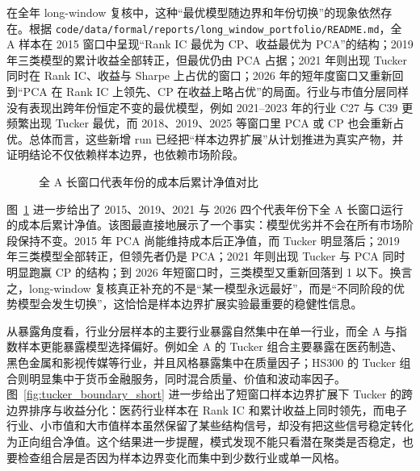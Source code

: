 在全年 long-window 复核中，这种“最优模型随边界和年份切换”的现象依然存在。根据 \texttt{code/data/formal/reports/long\_window\_portfolio/README.md}，全 A 样本在 2015 窗口中呈现“Rank IC 最优为 CP、收益最优为 PCA”的结构；2019 年三类模型的累计收益全部转正，但最优仍由 PCA 占据；2021 年则出现 Tucker 同时在 Rank IC、收益与 Sharpe 上占优的窗口；2026 年的短年度窗口又重新回到“PCA 在 Rank IC 上领先、CP 在收益上略占优”的局面。行业与市值分层同样没有表现出跨年份恒定不变的最优模型，例如 2021--2023 年的行业 C27 与 C39 更频繁出现 Tucker 最优，而 2018、2019、2025 等窗口里 PCA 或 CP 也会重新占优。总体而言，这些新增 run 已经把“样本边界扩展”从计划推进为真实产物，并证明结论不仅依赖样本边界，也依赖市场阶段。

\begin{figure}[!t]
\centering
{}
\caption{全 A 长窗口代表年份的成本后累计净值对比}
\label{fig:all_a_long_window_cost}
\end{figure}

图~\ref{fig:all_a_long_window_cost} 进一步给出了 2015、2019、2021 与 2026 四个代表年份下全 A 长窗口运行的成本后累计净值。该图最直接地展示了一个事实：模型优劣并不会在所有市场阶段保持不变。2015 年 PCA 尚能维持成本后正净值，而 Tucker 明显落后；2019 年三类模型全部转正，但领先者仍是 PCA；2021 年则出现 Tucker 与 PCA 同时明显跑赢 CP 的结构；到 2026 年短窗口时，三类模型又重新回落到 1 以下。换言之，long-window 复核真正补充的不是“某一模型永远最好”，而是“不同阶段的优势模型会发生切换”，这恰恰是样本边界扩展实验最重要的稳健性信息。

从暴露角度看，行业分层样本的主要行业暴露自然集中在单一行业，而全 A 与指数样本更能暴露模型选择偏好。例如全 A 的 Tucker 组合主要暴露在医药制造、黑色金属和影视传媒等行业，并且风格暴露集中在质量因子；HS300 的 Tucker 组合则明显集中于货币金融服务，同时混合质量、价值和波动率因子。图~\ref{fig:tucker_boundary_short} 进一步给出了短窗口样本边界扩展下 Tucker 的跨边界排序与收益分化：医药行业样本在 Rank IC 和累计收益上同时领先，而电子行业、小市值和大市值样本虽然保留了某些结构信号，却没有把这些信号稳定转化为正向组合净值。这个结果进一步提醒，模式发现不能只看潜在聚类是否稳定，也要检查组合层是否因为样本边界变化而集中到少数行业或单一风格。

